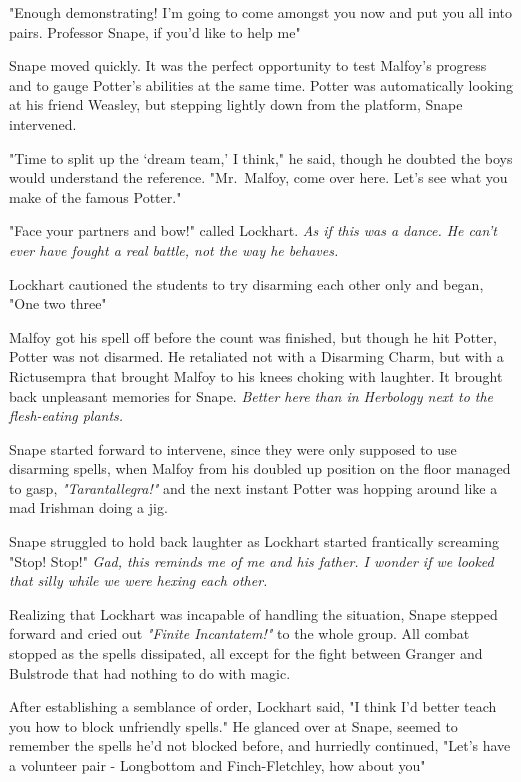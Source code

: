 "Enough demonstrating! I'm going to come amongst you now and put you all into pairs. Professor Snape, if you'd like to help me{\el}"

Snape moved quickly. It was the perfect opportunity to test Malfoy's progress and to gauge Potter's abilities at the same time. Potter was automatically looking at his friend Weasley, but stepping lightly down from the platform, Snape intervened.

"Time to split up the `dream team,' I think," he said, though he doubted the boys would understand the reference. "Mr.~Malfoy, come over here. Let's see what you make of the famous Potter."

"Face your partners and bow!" called Lockhart. \emph{As if this was a dance. He can't ever have fought a real battle, not the way he behaves.}

Lockhart cautioned the students to try disarming each other only and began, "One{\el} two{\el} three{\el}"

Malfoy got his spell off before the count was finished, but though he hit Potter, Potter was not disarmed. He retaliated not with a Disarming Charm, but with a Rictusempra that brought Malfoy to his knees choking with laughter. It brought back unpleasant memories for Snape. \emph{Better here than in Herbology next to the flesh-eating plants.}

Snape started forward to intervene, since they were only supposed to use disarming spells, when Malfoy from his doubled up position on the floor managed to gasp, \emph{"Tarantallegra!"} and the next instant Potter was hopping around like a mad Irishman doing a jig.

Snape struggled to hold back laughter as Lockhart started frantically screaming "Stop! Stop!" \emph{Gad, this reminds me of me and his father. I wonder if we looked that silly while we were hexing each other.}

Realizing that Lockhart was incapable of handling the situation, Snape stepped forward and cried out \emph{"Finite Incantatem!"} to the whole group. All combat stopped as the spells dissipated, all except for the fight between Granger and Bulstrode that had nothing to do with magic.

After establishing a semblance of order, Lockhart said, "I think I'd better teach you how to block unfriendly spells." He glanced over at Snape, seemed to remember the spells he'd not blocked before, and hurriedly continued, "Let's have a volunteer pair - Longbottom and Finch-Fletchley, how about you{\el}"

